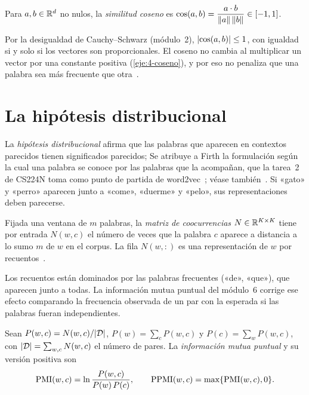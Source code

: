 \begin{definicion}
Para $a,b\in\mathbb{R}^{d}$ no nulos, la \emph{similitud coseno} es $\cos(a,b)=\dfrac{a\cdot b}{\lVert a\rVert\,\lVert b\rVert}\in[-1,1]$.
\end{definicion}

Por la desigualdad de Cauchy--Schwarz (módulo~2), $\lvert\cos(a,b)\rvert\le 1$, con igualdad si y solo si los vectores son proporcionales. El coseno no cambia al multiplicar un vector por una constante positiva (\cref{eje:4-coseno}), y por eso no penaliza que una palabra sea más frecuente que otra~\cite[§5.4]{jm3}.

\section{La hipótesis distribucional}

La \emph{hipótesis distribucional} afirma que las palabras que aparecen en contextos parecidos tienen significados parecidos; Se atribuye a Firth la formulación según la cual una palabra se conoce por las palabras que la acompañan, que la tarea~2 de CS224N toma como punto de partida de word2vec~\cite{cs224n}; véase también~\cite[§5.2]{jm3}. Si «gato» y «perro» aparecen junto a «come», «duerme» y «pelo», sus representaciones deben parecerse.

\begin{definicion}
Fijada una ventana de $m$ palabras, la \emph{matriz de coocurrencias} $N\in\mathbb{R}^{K\times K}$ tiene por entrada $N(w,c)$ el número de veces que la palabra $c$ aparece a distancia a lo sumo $m$ de $w$ en el corpus. La fila $N(w,:)$ es una representación de $w$ por recuentos~\cite[§5.3]{jm3}.
\end{definicion}

Los recuentos están dominados por las palabras frecuentes («de», «que»), que aparecen junto a todas. La información mutua puntual del módulo~6 corrige ese efecto comparando la frecuencia observada de un par con la esperada si las palabras fueran independientes.

\begin{definicion}\label{def:pmi}
Sean $P(w,c)=N(w,c)/\lvert\mathcal{D}\rvert$, $P(w)=\sum_c P(w,c)$ y $P(c)=\sum_w P(w,c)$, con $\lvert\mathcal{D}\rvert=\sum_{w,c}N(w,c)$ el número de pares. La \emph{información mutua puntual} y su versión positiva son
\[
\operatorname{PMI}(w,c)=\ln\frac{P(w,c)}{P(w)\,P(c)},\qquad \operatorname{PPMI}(w,c)=\max\{\operatorname{PMI}(w,c),0\}.
\]
\end{definicion}

